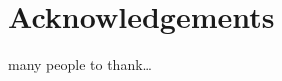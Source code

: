 \chapter*{Acknowledgements}

many people to thank\dots

\thispagestyle{empty}

\cleardoublepage{}
\thispagestyle{empty}
